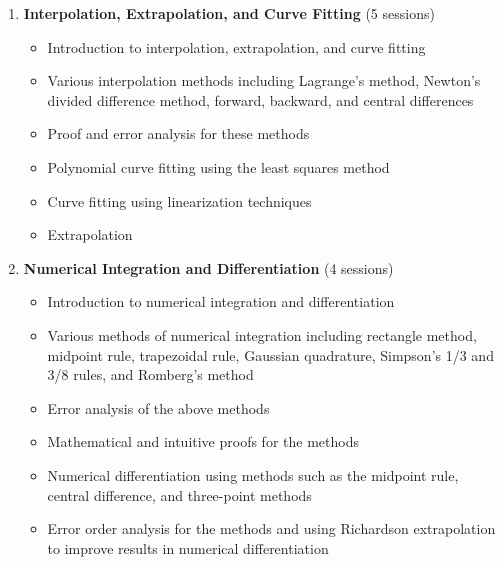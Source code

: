 \documentclass[12pt]{article}
\begin{document}
\begin{enumerate}
    \item \textbf{Interpolation, Extrapolation, and Curve Fitting} (5 sessions)
        \begin{itemize}
            \item Introduction to interpolation, extrapolation, and curve fitting
            \item Various interpolation methods including Lagrange's method, Newton's divided difference method, forward, backward, and central differences
            \item Proof and error analysis for these methods
            \item Polynomial curve fitting using the least squares method
            \item Curve fitting using linearization techniques
            \item Extrapolation
        \end{itemize}

    \item \textbf{Numerical Integration and Differentiation} (4 sessions)
        \begin{itemize}
            \item Introduction to numerical integration and differentiation
            \item Various methods of numerical integration including rectangle method, midpoint rule, trapezoidal rule, Gaussian quadrature, Simpson’s 1/3 and 3/8 rules, and Romberg's method
            \item Error analysis of the above methods
            \item Mathematical and intuitive proofs for the methods
            \item Numerical differentiation using methods such as the midpoint rule, central difference, and three-point methods
            \item Error order analysis for the methods and using Richardson extrapolation to improve results in numerical differentiation
        \end{itemize}


\end{enumerate}
\end{document}
